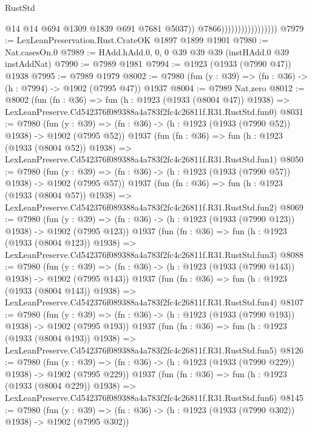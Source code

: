 \begin{lexlean}{RustStd}
\begin{coremodule}
                                          @14
                                          @14
                                          @694
                                          @1309
                                          @1839
                                          @691
                                          @7681
                                          @5037))
                                      @7866)))))))))))))))))
@7979 := LexLeanPreservation.Rust.CrateOK @1897 @1899 @1901
@7980 := Nat.casesOn.{0}
@7989 := HAdd.hAdd.{0, 0, 0} @39 @39 @39 (instHAdd.{0} @39 instAddNat)
@7990 := @7989 @1981
@7994 := @1923 (@1933 (@7990 @47)) @1938
@7995 := @7989 @1979
@8002 := @7980 (fun (y : @39) => (fn : @36) -> (h : @7994) -> @1902 (@7995 @47)) @1937
@8004 := @7989 Nat.zero
@8012 := @8002
    (fun (fn : @36) =>
    fun (h : @1923 (@1933 (@8004 @47)) @1938) =>
    LexLeanPreserve.Cd542376f089388a4a783f2fc4c26811f.R31.RustStd.fun0)
@8031 := @7980
    (fun (y : @39) => (fn : @36) -> (h : @1923 (@1933 (@7990 @52)) @1938) -> @1902 (@7995 @52))
    @1937
    (fun (fn : @36) =>
    fun (h : @1923 (@1933 (@8004 @52)) @1938) =>
    LexLeanPreserve.Cd542376f089388a4a783f2fc4c26811f.R31.RustStd.fun1)
@8050 := @7980
    (fun (y : @39) => (fn : @36) -> (h : @1923 (@1933 (@7990 @57)) @1938) -> @1902 (@7995 @57))
    @1937
    (fun (fn : @36) =>
    fun (h : @1923 (@1933 (@8004 @57)) @1938) =>
    LexLeanPreserve.Cd542376f089388a4a783f2fc4c26811f.R31.RustStd.fun2)
@8069 := @7980
    (fun (y : @39) => (fn : @36) -> (h : @1923 (@1933 (@7990 @123)) @1938) -> @1902 (@7995 @123))
    @1937
    (fun (fn : @36) =>
    fun (h : @1923 (@1933 (@8004 @123)) @1938) =>
    LexLeanPreserve.Cd542376f089388a4a783f2fc4c26811f.R31.RustStd.fun3)
@8088 := @7980
    (fun (y : @39) => (fn : @36) -> (h : @1923 (@1933 (@7990 @143)) @1938) -> @1902 (@7995 @143))
    @1937
    (fun (fn : @36) =>
    fun (h : @1923 (@1933 (@8004 @143)) @1938) =>
    LexLeanPreserve.Cd542376f089388a4a783f2fc4c26811f.R31.RustStd.fun4)
@8107 := @7980
    (fun (y : @39) => (fn : @36) -> (h : @1923 (@1933 (@7990 @193)) @1938) -> @1902 (@7995 @193))
    @1937
    (fun (fn : @36) =>
    fun (h : @1923 (@1933 (@8004 @193)) @1938) =>
    LexLeanPreserve.Cd542376f089388a4a783f2fc4c26811f.R31.RustStd.fun5)
@8126 := @7980
    (fun (y : @39) => (fn : @36) -> (h : @1923 (@1933 (@7990 @229)) @1938) -> @1902 (@7995 @229))
    @1937
    (fun (fn : @36) =>
    fun (h : @1923 (@1933 (@8004 @229)) @1938) =>
    LexLeanPreserve.Cd542376f089388a4a783f2fc4c26811f.R31.RustStd.fun6)
@8145 := @7980
    (fun (y : @39) => (fn : @36) -> (h : @1923 (@1933 (@7990 @302)) @1938) -> @1902 (@7995 @302))

\end{coremodule}
\end{lexlean}
